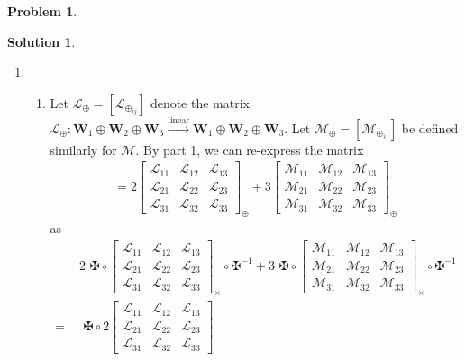 \documentclass{article}
\theoremstyle{definition}
\newtheorem*{prob*}{Problem}
\newtheorem*{sln*}{Solution}
\newcommand{\W}{\mathbf{W}}
\newcommand{\lag}{\mathcal{L}}
\newcommand{\M}{\mathcal{M}}
\newcommand{\lin}{\overset{\text{linear}}{\longrightarrow}}
\begin{document}
\begin{prob*}
\begin{sln*}
\begin{enumerate}
						
						
						
						
						
						
		
			\newpage
			
			
			

			
			
			\item 
			\begin{enumerate}
				\item Let $\lag_\oplus = [\lag_{\oplus_{ij}}]$ denote the matrix $\lag_\oplus : \W_1\oplus\W_2\oplus\W_3\lin\W_1\oplus\W_2\oplus\W_3$. Let $\M_\oplus = [\M_{\oplus_{ij}}]$ be defined similarly for $\M$. By part 1, we can re-express the matrix 
				\begin{align*}
				[(2\lag_\oplus + 3\M_\oplus)_{ij}] = 2\begin{bmatrix}
				\lag_{11} & \lag_{12} & \lag_{13}\\
				\lag_{21} & \lag_{22} & \lag_{23}\\
				\lag_{31} & \lag_{32} & \lag_{33}
				\end{bmatrix}_\oplus
				+ 
				3\begin{bmatrix}
				\M_{11} & \M_{12} & \M_{13}\\
				\M_{21} & \M_{22} & \M_{23}\\
				\M_{31} & \M_{32} & \M_{33}
				\end{bmatrix}_\oplus 
				\end{align*}
				as 
				\begin{align*}
				&2\,\,\maltese \circ \begin{bmatrix}
				\lag_{11} & \lag_{12} & \lag_{13}\\
				\lag_{21} & \lag_{22} & \lag_{23}\\
				\lag_{31} & \lag_{32} & \lag_{33}
				\end{bmatrix}_\times \circ \maltese^{-1}
				+ 
				3\,\,\maltese\circ\begin{bmatrix}
				\M_{11} & \M_{12} & \M_{13}\\
				\M_{21} & \M_{22} & \M_{23}\\
				\M_{31} & \M_{32} & \M_{33}
				\end{bmatrix}_\times \circ \maltese^{-1} \\
				=\,\,
				&\,\,\maltese \circ 2\begin{bmatrix}
				\lag_{11} & \lag_{12} & \lag_{13}\\
				\lag_{21} & \lag_{22} & \lag_{23}\\
				\lag_{31} & \lag_{32} & \lag_{33}

\end{bmatrix}
\end{align*}
\end{enumerate}
\end{enumerate}
\end{sln*}
\end{prob*}
\end{document}
